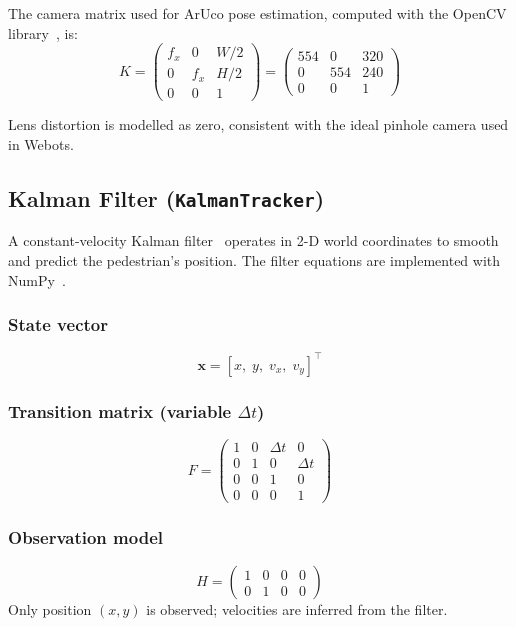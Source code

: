 \documentclass[12pt,a4paper]{article}
\begin{document}
The camera matrix used for ArUco pose estimation, computed with the
OpenCV library~\cite{opencv}, is:
\begin{equation}
  K = \begin{pmatrix} f_x & 0 & W/2 \\ 0 & f_x & H/2 \\ 0 & 0 & 1 \end{pmatrix}
    = \begin{pmatrix} 554 & 0 & 320 \\ 0 & 554 & 240 \\ 0 & 0 & 1 \end{pmatrix}
\end{equation}

Lens distortion is modelled as zero, consistent with the ideal pinhole
camera used in Webots.

\subsection{Kalman Filter (\texttt{KalmanTracker})}

A constant-velocity Kalman filter~\cite{kalman,barshalom} operates in 2-D
world coordinates to
smooth and predict the pedestrian's position. The filter equations are
implemented with NumPy~\cite{numpy}.

\subsubsection*{State vector}
\[
  \mathbf{x} = [x,\; y,\; v_x,\; v_y]^{\top}
\]

\subsubsection*{Transition matrix (variable $\Delta t$)}
\[
  F = \begin{pmatrix}
    1 & 0 & \Delta t & 0 \\
    0 & 1 & 0 & \Delta t \\
    0 & 0 & 1 & 0 \\
    0 & 0 & 0 & 1
  \end{pmatrix}
\]

\subsubsection*{Observation model}
\[
  H = \begin{pmatrix} 1 & 0 & 0 & 0 \\ 0 & 1 & 0 & 0 \end{pmatrix}
\]
Only position $(x, y)$ is observed; velocities are inferred from the filter.
\end{document}
